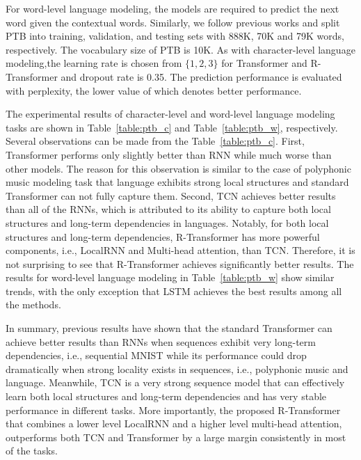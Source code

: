\documentclass{article} \usepackage{iclr2019_conference,times}
\begin{document}
For word-level language modeling, the models are required to predict the next word given the contextual words. Similarly, we follow previous works and split PTB into training, validation, and testing sets with 888K, 70K and 79K words, respectively. The vocabulary size of PTB is 10K. As with character-level language modeling,the learning rate is chosen from $\{1, 2, 3\}$ for Transformer and R-Transformer and dropout rate is 0.35. The prediction performance is evaluated with perplexity, the lower value of which denotes better performance.


The experimental results of character-level and word-level language modeling tasks are shown in Table~\ref{table:ptb_c} and Table~\ref{table:ptb_w}, respectively. Several observations can be made from the Table~\ref{table:ptb_c}. First, Transformer performs only slightly better than RNN while much worse than other models. The reason for this observation is similar to the case of polyphonic music modeling task that language exhibits strong local structures and standard Transformer can not fully capture them.  Second, TCN achieves better results than all of the RNNs, which is attributed to its ability to capture both local structures and long-term dependencies in languages. Notably, for both local structures and long-term dependencies, R-Transformer has more powerful components, i.e., LocalRNN and Multi-head attention, than TCN. Therefore, it is not surprising to see that R-Transformer achieves significantly better results. The results for word-level language modeling in Table~\ref{table:ptb_w} show similar trends, with the only exception that LSTM achieves the best results among all the methods.

In summary, previous results have shown that the standard Transformer can achieve better results than RNNs when sequences exhibit very long-term dependencies, i.e., sequential MNIST while its performance could drop dramatically when strong locality exists in sequences, i.e., polyphonic music and language. Meanwhile, TCN is a very strong sequence model that can effectively learn both local structures and long-term dependencies and has very stable performance in different tasks. More importantly, the proposed R-Transformer that combines a lower level LocalRNN and a higher level multi-head attention, outperforms both TCN and Transformer by a large margin consistently in  most of the tasks.
\end{document}

